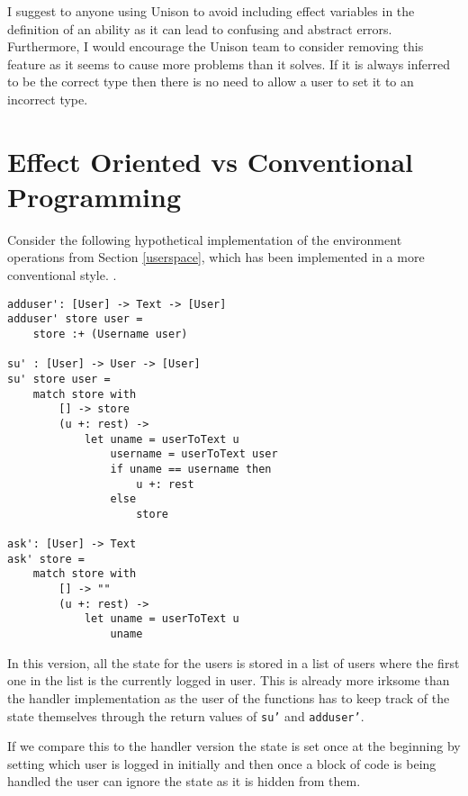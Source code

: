 \documentclass[logo,bsc,singlespacing,parskip]{infthesis}
\begin{document}
I suggest to anyone using Unison to avoid including effect variables in the
definition of an ability as it can lead to confusing and abstract errors.
Furthermore, I would encourage the Unison team to consider removing this
feature as it seems to cause more problems than it solves. If it is always
inferred to be the correct type then there is no need to allow a user to set it
to an incorrect type.


\section{Effect Oriented vs Conventional Programming}
\label{effop}

Consider the following hypothetical implementation of the environment operations from Section \ref{userspace}, which has been implemented in a more conventional style.
.

\begin{lstlisting}[language=unison]
adduser': [User] -> Text -> [User]
adduser' store user =
    store :+ (Username user)

su' : [User] -> User -> [User]
su' store user =
    match store with
        [] -> store
        (u +: rest) ->
            let uname = userToText u
                username = userToText user
                if uname == username then
                    u +: rest
                else
                    store

ask': [User] -> Text
ask' store =
    match store with
        [] -> ""
        (u +: rest) ->
            let uname = userToText u
                uname
\end{lstlisting}

In this version, all the state for the users is stored in a list of users where
the first one in the list is the currently logged in user. This is already more
irksome than the handler implementation as the user of the functions has to keep
track of the state themselves through the return values of \texttt{su'} and
\texttt{adduser'}.

If we compare this to the handler version the state is set once at the beginning
by setting which user is logged in initially and then once a block of code is
being handled the user can ignore the state as it is hidden from them.
\end{document}
